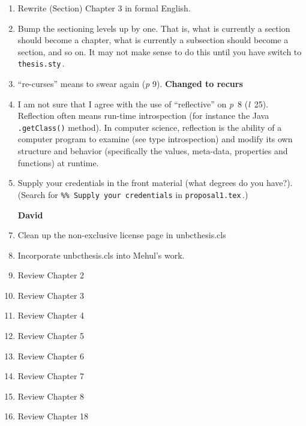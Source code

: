 \begin{scope}
\begin{enumerate}
  The \Verb!\paragraph! command is in the same family as \Verb!chapter!,
  \Verb!\section!, and so on.  For its correct use, see later in this
  file.

  If you don't like the shape of the paragraphs that you get without
  \Verb!paragraph!, use something like
  \begin{Verbatim}
\setlength{\parindent}{3em}
\setlength{\parskip}{2\baselineskip}
  \end{Verbatim}
  to adjust either the initial paragraph indent, or the inter-paragraph
  space.

\item
  Rewrite (Section) Chapter 3 in formal English.

\item
  Bump the sectioning levels up by one.  That is, what is currently a
  section should become a chapter, what is currently a subsection should
  become a section, and so on.  It may not make sense to do this until
  you have switch to \Verb!thesis.sty!\,.

\item
  ``re-curses'' means to swear again (\textit{p} 9). \textbf{Changed to recurs}
\item
  I am not sure that I agree with the use of ``reflective'' on
  \textit{p}~8 (\textit{l}~25).  Reflection often means run-time
  introspection (for instance the Java \Verb!.getClass()! method).
  In computer science, reflection is the ability of a computer program to examine (see type introspection) and modify its own structure and behavior (specifically the values, meta-data, properties and functions) at runtime.
  
\item
  Supply your credentials in the front material (what degrees do you
  have?).
  (Search for \Verb!%

\item [\textbf{David}]
\item Clean up the non-exclusive license page in unbcthesis.cls
\item Incorporate unbcthesis.cls into Mehul's work.
\item Review Chapter 2
\item Review Chapter 3
\item Review Chapter 4
\item Review Chapter 5
\item Review Chapter 6
\item Review Chapter 7
\item Review Chapter 8
\item Review Chapter 18


\end{enumerate}
\end{scope}
